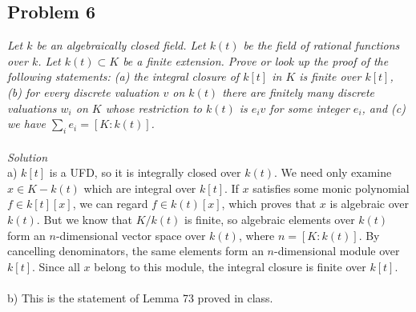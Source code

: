 \documentclass[12 pt]{article}
\begin{document}
\subsection*{Problem 6}
\emph{Let $k$ be an algebraically closed field. Let $k(t)$ be the field of rational functions over $k$. Let $k(t) \subset K$ be a finite extension. Prove or look up the proof of the following statements: (a) the integral closure of $k[t]$ in $K$ is finite over $k[t]$, (b) for every discrete valuation $v$ on $k(t)$ there are finitely many discrete valuations $w_i$ on $K$ whose restriction to $k(t)$ is $e_iv$ for some integer $e_i$, and (c) we have $\sum_i e_i = [K : k(t)]$.}
\\
\\
\emph{Solution}
\\
a) $k[t]$ is a UFD, so it is integrally closed over $k(t)$. We need only examine $x\in K - k(t)$ which are integral over $k[t]$. If $x$ satisfies some monic polynomial $f \in k[t][x]$, we can regard $f \in k(t)[x]$, which proves that $x$ is algebraic over $k(t)$. But we know that $K/k(t)$ is finite, so algebraic elements over $k(t)$ form an $n$-dimensional vector space over $k(t)$, where $n = [K : k(t)]$. By cancelling denominators, the same elements form an $n$-dimensional module over $k[t]$. Since all $x$ belong to this module, the integral closure is finite over $k[t]$.
\\
\\
b) This is the statement of Lemma 73 proved in class.
\end{document}
